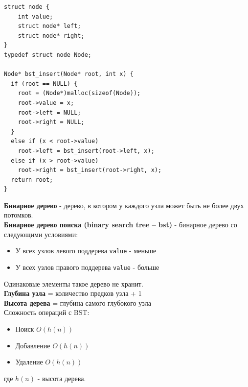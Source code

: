\documentclass{article}
\begin{document}
\begin{multicols}{2}
\begin{lstlisting}
struct node {
    int value;
    struct node* left;
    struct node* right;
}
typedef struct node Node;

Node* bst_insert(Node* root, int x) {
  if (root == NULL) {
    root = (Node*)malloc(sizeof(Node));
    root->value = x;
    root->left = NULL;
    root->right = NULL;
  }
  else if (x < root->value)
    root->left = bst_insert(root->left, x);
  else if (x > root->value)
    root->right = bst_insert(root->right, x);
  return root;
}
\end{lstlisting}
\vfill\null
\columnbreak
\textbf{Бинарное дерево} - дерево, в котором у каждого узла может быть не более двух потомков.\\
\textbf{Бинарное дерево поиска (binary search tree -- bst)} - бинарное дерево со следующими условиями:
\begin{itemize}
\item У всех узлов левого поддерева \texttt{value} - меньше
\item У всех узлов правого поддерева \texttt{value} - больше
\end{itemize}
Одинаковые элементы такое дерево не хранит.\\
\textbf{Глубина узла} = количество предков узла + 1\\
\textbf{Высота дерева} = глубина самого глубокого узла\\
Сложность операций с BST:
\begin{itemize}
\item Поиск $O(h(n))$
\item Добавление $O(h(n))$
\item Удаление $O(h(n))$
\end{itemize}
где $h(n)$ - высота дерева.\\
\vfill\null
\end{multicols}
\newpage
\end{document}
